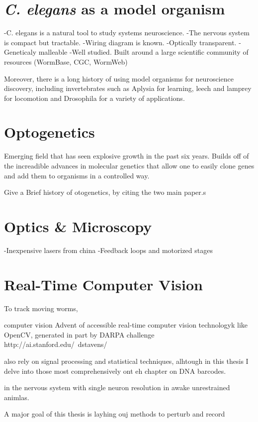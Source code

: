 \section{\textit{C. elegans} as a model organism}
-C. elegans is a natural tool to study systems neuroscience. 
-The nervous system is compact but tractable. 
-Wiring diagram is known.
-Optically transparent.
-Geneticaly malleable
-Well studied. Built around a large scientific community of resources (WormBase, CGC, WormWeb)

Moreover, there is a long history of using model organisms for neuroscience discovery, including invertebrates such as Aplysia for learning, leech and lamprey for locomotion and Drosophila for a variety of applications.

\section{Optogenetics}
Emerging field that has seen explosive growth in the past six years. Builds off of the increadible advances in molecular genetics that allow one to easily clone genes and add them to organisms in a controlled way.

Give a Brief history of otogenetics, by citing the two main paper.s
 

\section{Optics & Microscopy}
-Inexpensive lasers from china
-Feedback loops and motorized stages

\section{Real-Time Computer Vision} 
To track moving worms, 

computer vision
Advent of accessible real-time computer vision technologyk like OpenCV, generated in part by DARPA challenge http://ai.stanford.edu/~dstavens/

also rely on signal processing and statistical techniques, alhtough in this thesis I delve into those most comprehensively ont eh chapter on DNA barcodes.






in the nervous system with single neuron resolution in awake unrestrained animlas. 

A major goal of this thesis is layhing ouj methods to perturb and record 








